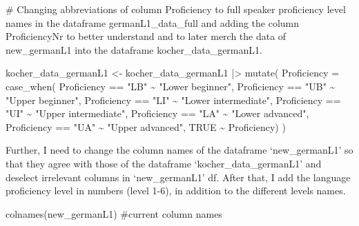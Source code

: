\documentclass[
  letterpaper,
  DIV=11,
  numbers=noendperiod]{scrartcl}
\newenvironment{Shaded}{\begin{snugshade}}{\end{snugshade}}
\newcommand{\AttributeTok}[1]{\textcolor[rgb]{0.40,0.45,0.13}{#1}}
\newcommand{\CommentTok}[1]{\textcolor[rgb]{0.37,0.37,0.37}{#1}}
\newcommand{\ConstantTok}[1]{\textcolor[rgb]{0.56,0.35,0.01}{#1}}
\newcommand{\FunctionTok}[1]{\textcolor[rgb]{0.28,0.35,0.67}{#1}}
\newcommand{\NormalTok}[1]{\textcolor[rgb]{0.00,0.23,0.31}{#1}}
\newcommand{\OtherTok}[1]{\textcolor[rgb]{0.00,0.23,0.31}{#1}}
\newcommand{\SpecialCharTok}[1]{\textcolor[rgb]{0.37,0.37,0.37}{#1}}
\newcommand{\StringTok}[1]{\textcolor[rgb]{0.13,0.47,0.30}{#1}}
\begin{document}
\begin{Shaded}
\begin{Highlighting}[]
\CommentTok{\# Changing abbreviations of column \textquotesingle{}Proficiency\textquotesingle{} to full speaker proficiency level names in the dataframe \textquotesingle{}germanL1\_data\_full\textquotesingle{} and adding the column \textquotesingle{}ProficiencyNr\textquotesingle{} to better understand and to later merch the data of \textquotesingle{}new\_germanL1\textquotesingle{} into the dataframe \textquotesingle{}kocher\_data\_germanL1\textquotesingle{}. }

\NormalTok{kocher\_data\_germanL1 }\OtherTok{\textless{}{-}}\NormalTok{ kocher\_data\_germanL1 }\SpecialCharTok{|\textgreater{}} 
  \FunctionTok{mutate}\NormalTok{(}
    \AttributeTok{Proficiency =} \FunctionTok{case\_when}\NormalTok{(}
\NormalTok{      Proficiency }\SpecialCharTok{==} \StringTok{"LB"} \SpecialCharTok{\textasciitilde{}} \StringTok{"Lower beginner"}\NormalTok{,}
\NormalTok{      Proficiency }\SpecialCharTok{==} \StringTok{"UB"} \SpecialCharTok{\textasciitilde{}} \StringTok{"Upper beginner"}\NormalTok{,}
\NormalTok{      Proficiency }\SpecialCharTok{==} \StringTok{"LI"} \SpecialCharTok{\textasciitilde{}} \StringTok{"Lower intermediate"}\NormalTok{,}
\NormalTok{      Proficiency }\SpecialCharTok{==} \StringTok{"UI"} \SpecialCharTok{\textasciitilde{}} \StringTok{"Upper intermediate"}\NormalTok{,}
\NormalTok{      Proficiency }\SpecialCharTok{==} \StringTok{"LA"} \SpecialCharTok{\textasciitilde{}} \StringTok{"Lower advanced"}\NormalTok{,}
\NormalTok{      Proficiency }\SpecialCharTok{==} \StringTok{"UA"} \SpecialCharTok{\textasciitilde{}} \StringTok{"Upper advanced"}\NormalTok{,}
      \ConstantTok{TRUE} \SpecialCharTok{\textasciitilde{}}\NormalTok{ Proficiency)}
\NormalTok{  )}
\end{Highlighting}
\end{Shaded}

Further, I need to change the column names of the dataframe
`new\_germanL1' so that they agree with those of the dataframe
`kocher\_data\_germanL1' and deselect irrelevant columns in
`new\_germanL1' df. After that, I add the language proficiency level in
numbers (level 1-6), in addition to the different levels names.

\begin{Shaded}
\begin{Highlighting}[]
\FunctionTok{colnames}\NormalTok{(new\_germanL1) }\CommentTok{\#current column names}
\end{Highlighting}
\end{Shaded}
\end{document}
